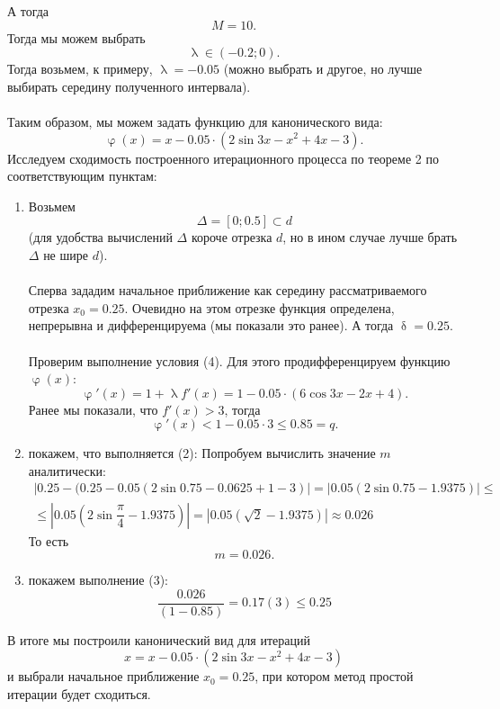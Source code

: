 \documentclass[a4paper, 12pt]{article}
\renewcommand{\leq}{\leqslant}
\renewcommand{\delta}{\updelta}
\renewcommand{\varphi}{\upvarphi}
\renewcommand{\lambda}{\uplambda}
\begin{document}
	А тогда $$M = 10.$$
	Тогда мы можем выбрать $$\lambda \in (-0.2; 0).$$ Тогда возьмем, к примеру, $\lambda = -0.05$ (можно выбрать и другое, но лучше выбирать середину полученного интервала).\\\\
	Таким образом, мы можем задать функцию для канонического вида: $$\varphi(x) = x - 0.05 \cdot (2\sin 3x - x^2 + 4x - 3).$$
	Исследуем сходимость построенного итерационного процесса по теореме 2 по соответствующим пунктам:
	\begin{enumerate}
		\item Возьмем $$\Delta = [0; 0.5]\subset d$$ (для удобства вычислений $\Delta$ короче отрезка $d$, но в ином случае лучше брать $\Delta$ не шире $d$).\\\\
		Сперва зададим начальное приближение как середину рассматриваемого отрезка $x_0 = 0.25$. Очевидно на этом отрезке функция определена, непрерывна и дифференцируема (мы показали это ранее). А тогда $\delta = 0.25$.\\\\
		Проверим выполнение условия (4). Для этого продифференцируем функцию $\varphi(x)$:
		$$\varphi'(x) = 1+\lambda f'(x) = 1 - 0.05 \cdot (6\cos 3x - 2x + 4).$$ Ранее мы показали, что $f'(x) > 3$, тогда $$\varphi'(x) < 1 - 0.05 \cdot 3 \leq 0.85 = q.$$
		\item покажем, что выполняется (2):
		Попробуем вычислить значение $m$ аналитически:
		\begin{multline*}
			| 0.25 - (0.25 - 0.05(2\sin0.75 - 0.0625 + 1 -3 ) | = |0.05(2\sin0.75 -1.9375)|\leq\\ \leq |0.05(2\sin\dfrac\pi4 -1.9375)|=|0.05(\sqrt2 - 1.9375)| \approx0.026
		\end{multline*}
		То есть $$m = 0.026.$$
		\item покажем выполнение (3):
		$$\dfrac{0.026}{(1-0.85)}=0.17(3) \leq 0.25$$
	\end{enumerate}
	В итоге мы построили канонический вид для итераций $$x = x - 0.05 \cdot (2\sin 3x - x^2 + 4x - 3)$$
	и выбрали начальное приближение $x_0=0.25$, при котором метод простой итерации будет сходиться.
\end{document}
